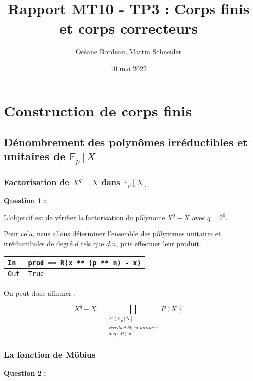 \documentclass[titlepage]{article}
\title{Rapport MT10 - TP3 : Corps finis et corps correcteurs}
\author{Océane Bordeau, Martin Schneider}
\date{10 mai 2022}
\begin{document}
    \maketitle
    \tableofcontents
    \pagebreak

    \section{Construction de corps finis}
        \setcounter{subsection}{2}
        \subsection{Dénombrement des polynômes irréductibles et unitaires de $\mathbb{F}_p[X]$}
            \subsubsection{Factorisation de $X^q-X$ dans $\mathbb{F}_p[X]$}
            \textbf{Question 1 :}

            L'objetcif est de vérifier la factorisation du pôlynome $X^q-X$ avec $q=2^6$.

            Pour cela, nous allons déterminer l'ensemble des pôlynomes unitaires et irréductibales de degré $d$ tels que $d|n$, puis effectuer leur produit.

            

            \begin{tabularx}{12cm}{|p{0.60cm}|X|}
                \hline
                \rowcolor{gray}
                \texttt{In}
                & 
                \texttt{prod == R(x ** (p ** n) - x)}
                \\
                \hline
                \texttt{Out}
                &
                \texttt{True}
                \\
                \hline
            \end{tabularx}
            \bigbreak

            On peut donc affirmer :

            \[ X^q-X=\prod_{\substack{P \in \mathbb{F}_p[X] \\ irr\acute{e}ductible \: et \: unitaire  \\ deg(P)|n}} P(X) \]

            \subsubsection{La fonction de Möbius}
            \textbf{Question 2 :}
\end{document}
